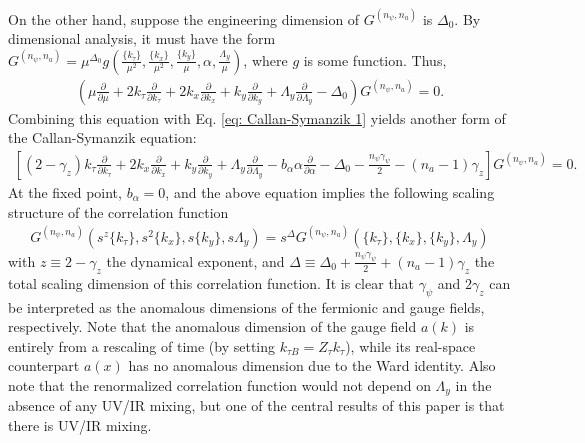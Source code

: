 \documentclass[prx,amsmath,amssymb, notitlepage, onecolumn,
nofootinbib,
superscriptaddress,
longbibliography
]{revtex4-1}
\newcommand{\beq}{\begin{eqnarray}}
\newcommand{\eeq}{\end{eqnarray}}
\begin{document}
On the other hand, suppose the engineering dimension of $G^{(n_\psi, n_a)}$ is $\Delta_0$. By dimensional analysis, it must have the form $G^{(n_\psi, n_a)}=\mu^{\Delta_0}g\left(\frac{\{k_\tau\}}{\mu^2}, \frac{\{k_x\}}{\mu^2}, \frac{\{k_y\}}{\mu}, \alpha, \frac{\Lambda_y}{\mu}\right)$, where $g$ is some function. Thus,
\beq
\left(\mu\frac{\partial}{\partial\mu}+2k_\tau\frac{\partial}{\partial k_\tau}+2k_x\frac{\partial}{\partial k_x}+k_y\frac{\partial}{\partial k_y}+\Lambda_y\frac{\partial}{\partial\Lambda_y}-\Delta_0\right)G^{(n_\psi, n_a)}=0.
\eeq
Combining this equation with Eq. \eqref{eq: Callan-Symanzik 1} yields another form of the Callan-Symanzik equation:
\beq \label{eq: Callan-Symanzik useful 1}
\left[(2-\gamma_z)k_\tau\frac{\partial}{\partial k_\tau}+2k_x\frac{\partial}{\partial k_x}+k_y\frac{\partial}{\partial k_y}+\Lambda_y\frac{\partial}{\partial\Lambda_y}-b_{\alpha}\alpha\frac{\partial}{\partial\alpha}-\Delta_0-\frac{n_\psi\gamma_\psi}{2}-(n_a-1)\gamma_z\right]G^{(n_\psi, n_a)}=0.
\eeq
At the fixed point, $b_{\alpha}=0$, and the above equation implies the following scaling structure of the correlation function
\beq
G^{(n_\psi, n_a)}(s^z\{k_\tau\}, s^2\{k_x\}, s\{k_y\}, s\Lambda_y)=s^{\Delta}G^{(n_\psi, n_a)}(\{k_\tau\}, \{k_x\}, \{k_y\}, \Lambda_y)
\eeq
with $z\equiv 2-\gamma_z$ the dynamical exponent, and $\Delta\equiv \Delta_0+\frac{n_\psi\gamma_\psi}{2}+(n_a-1)\gamma_z$ the total scaling dimension of this correlation function. It is clear that $\gamma_\psi$ and $2\gamma_z$ can be interpreted as the anomalous dimensions of the fermionic and gauge fields, respectively. Note that the anomalous dimension of the gauge field $a(k)$ is entirely from a rescaling of time (by setting $k_{\tau B}=Z_\tau k_\tau$), while its real-space counterpart $a(x)$ has no anomalous dimension due to the Ward identity. 
Also note that the renormalized correlation function would not depend on $\Lambda_y$ in the absence of any UV/IR mixing, but one of the central results of this paper is that there is UV/IR mixing.
\end{document}
